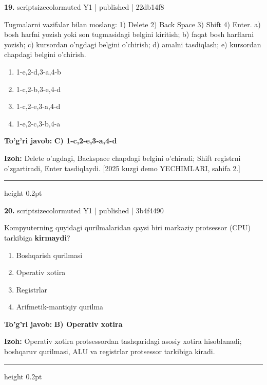 \documentclass[10pt,a4paper]{article}
\begin{document}
{\bfseries\sffamily\color{ink} 19.} {scriptsizecolor{muted} Y1 | published | 22db14f8}
\par
Tugmalarni vazifalar bilan moslang: 1) Delete 2) Back Space 3) Shift 4) Enter. a) bosh harfni yozish yoki son tugmasidagi belgini kiritish; b) faqat bosh harflarni yozish; c) kursordan o'ngdagi belgini o'chirish; d) amalni tasdiqlash; e) kursordan chapdagi belgini o'chirish.
\begin{enumerate}[label=\Alph*),leftmargin=9mm]
\item 1-e,2-d,3-a,4-b
\item 1-c,2-b,3-e,4-d
\item 1-c,2-e,3-a,4-d
\item 1-e,2-c,3-b,4-a
\end{enumerate}
\begin{tcolorbox}[enhanced,breakable,colback=teal!4,colframe=teal!60!black,boxrule=0.45pt,arc=1.2mm,left=2.7mm,right=2.7mm,top=1.8mm,bottom=1.8mm,before skip=2mm,after skip=2mm]
{\bfseries\sffamily\color{teal}To'g'ri javob:} \textbf{C) 1-c,2-e,3-a,4-d}
\par\smallskip
{\bfseries Izoh:} Delete o'ngdagi, Backspace chapdagi belgini o'chiradi; Shift registrni o'zgartiradi, Enter tasdiqlaydi. [2025 kuzgi demo YECHIMLARI, sahifa 2.]
\end{tcolorbox}
\vspace{2mm}\hrule height 0.2pt\vspace{3mm}

{\bfseries\sffamily\color{ink} 20.} {scriptsizecolor{muted} Y1 | published | 3b4f4490}
\par
Kompyuterning quyidagi qurilmalaridan qaysi biri markaziy protsessor (CPU) tarkibiga \textbf{kirmaydi}?
\begin{enumerate}[label=\Alph*),leftmargin=9mm]
\item Boshqarish qurilmasi
\item Operativ xotira
\item Registrlar
\item Arifmetik-mantiqiy qurilma
\end{enumerate}
\begin{tcolorbox}[enhanced,breakable,colback=teal!4,colframe=teal!60!black,boxrule=0.45pt,arc=1.2mm,left=2.7mm,right=2.7mm,top=1.8mm,bottom=1.8mm,before skip=2mm,after skip=2mm]
{\bfseries\sffamily\color{teal}To'g'ri javob:} \textbf{B) Operativ xotira}
\par\smallskip
{\bfseries Izoh:} Operativ xotira protsessordan tashqaridagi asosiy xotira hisoblanadi; boshqaruv qurilmasi, ALU va registrlar protsessor tarkibiga kiradi.
\end{tcolorbox}
\vspace{2mm}\hrule height 0.2pt\vspace{3mm}
\end{document}
